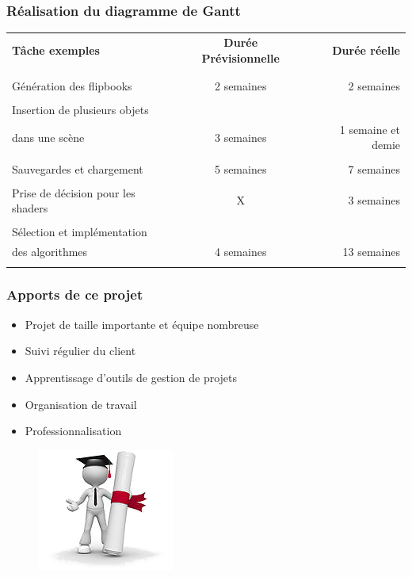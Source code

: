 \documentclass{beamer}
\begin{document}
\begin{frame}
\frametitle{Réalisation du diagramme de Gantt}
{\fontsize{7}{8}\selectfont
{}
\begin{tabular}{lcr}

\textbf{Tâche exemples} & \textbf{Durée Prévisionnelle} & \textbf{Durée réelle} \\
\\
\hline
\\
Génération des flipbooks & 2 semaines & 2 semaines \\
\hline
\\
Insertion de plusieurs objets \\ dans une scène &
3 semaines & 
1 semaine et demie\\
\hline
\\
Sauvegardes et chargement & 5 semaines &
7 semaines \\
\hline
\\
Prise de décision pour les shaders & X & 3 semaines\\
\hline
\\
Sélection et implémentation \\des algorithmes &
4 semaines & 13 semaines \\
\hline
\\

\end{tabular}
}

\end{frame}


\begin{frame}
\frametitle{Apports de ce projet}
\begin{itemize}[label=$\bullet$]
\item Projet de taille importante et équipe nombreuse
\item Suivi régulier du client
\item Apprentissage d'outils de gestion de projets
\item Organisation de travail
\item Professionnalisation	
\end{itemize}
\begin{figure}[B]

\includegraphics[scale=0.4]{clipart-apport.png}
\end{figure}

\end{frame}
\end{document}
